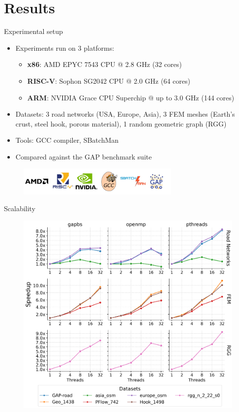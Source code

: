 \section{Results}
\begin{frame}{Experimental setup}
\begin{itemize}
  \item<1-> Experiments run on 3 platforms:
  \begin{itemize}
    \item \textbf{x86}: AMD EPYC 7543 CPU @ 2.8 GHz (32 cores)
    \item \textbf{RISC-V}: Sophon SG2042 CPU @ 2.0 GHz (64 cores)
    \item \textbf{ARM}: NVIDIA Grace CPU Superchip @ up to 3.0 GHz (144 cores)
  \end{itemize}
  \item<2-> Datasets: 3 road networks (USA, Europe, Asia), 3 FEM meshes (Earth's crust, steel hook, porous material), 1 random geometric graph (RGG)
  \item<3-> Tools: GCC compiler, SBatchMan
  \item<4-> Compared against the GAP benchmark suite 
\end{itemize}
\begin{figure}
  \centering
  \includegraphics[height=1.4cm]{images/tools.png}
\end{figure}
\vspace{2mm}
\end{frame}

\begin{frame}{Scalability}
\begin{figure}
  \centering
  \includegraphics[width=0.6\linewidth]{images/scalability.png}
\end{figure}
\end{frame}

